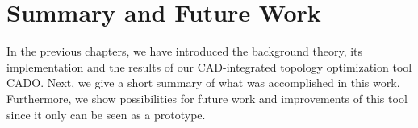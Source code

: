 \chapter{Summary and Future Work}
In the previous chapters, we have introduced the background theory, its implementation and the results of our CAD-integrated topology optimization tool CADO. Next, we give a short summary of what was accomplished in this work. Furthermore, we show possibilities for future work and improvements of this tool since it only can be seen as a prototype.




